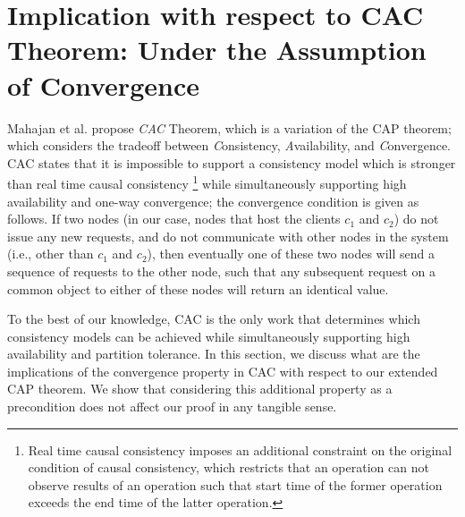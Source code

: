 \documentclass[journal,compsoc]{IEEEtran}
\begin{document}
\section{Implication with respect to CAC Theorem: Under the Assumption of Convergence} 
Mahajan et al. \cite{mahajan11cacTR}  propose  \emph{CAC} Theorem, which is a variation of the CAP theorem; which considers the tradeoff between \emph{C}onsistency,  \emph{A}vailability, and  \emph{C}onvergence. 
 CAC states that it is impossible to support a consistency model  which is stronger than real time causal consistency \footnote{Real time causal consistency imposes an additional constraint on the original condition of causal consistency, which restricts that an operation can not observe results of an operation such that start time of the former operation exceeds the end time of the latter operation.} while simultaneously supporting high availability and one-way convergence;  the convergence condition \cite{mahajan11cacTR} is given as follows. If two nodes (in our case, nodes that host the clients $c_1$ and $c_2$) do not issue any new requests, and do not communicate with other nodes in the system (i.e., other than $c_1$ and $c_2$), then eventually one of these two nodes will send a sequence of requests to the other node, such that any subsequent request on a common object to either of these nodes will return an identical value.  
 \par To the best of our knowledge, CAC is the only work that determines which consistency models can be achieved while simultaneously supporting high availability and partition tolerance. In this section, we discuss what are the implications of the convergence property in CAC with respect to our extended CAP theorem. We show that considering this additional  property as a precondition does not affect our proof in any tangible sense. 
\end{document}

